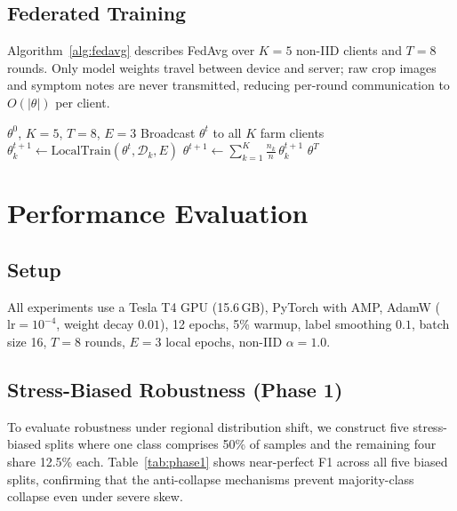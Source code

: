 \documentclass[conference]{IEEEtran}
\begin{document}
\subsection{Federated Training}

Algorithm~\ref{alg:fedavg} describes FedAvg over $K{=}5$ non-IID clients
and $T{=}8$ rounds. Only model weights travel between device and server;
raw crop images and symptom notes are never transmitted, reducing
per-round communication to $O(|\theta|)$ per client.

\begin{algorithm}[t]
\caption{FarmFederate FedAvg}
\label{alg:fedavg}
\begin{algorithmic}[1]
\REQUIRE $\theta^0$, $K{=}5$, $T{=}8$, $E{=}3$
  \STATE Broadcast $\theta^t$ to all $K$ farm clients
    \STATE $\theta_k^{t+1} \!\leftarrow\! \mathrm{LocalTrain}(\theta^t,\mathcal{D}_k,E)$
  \ENDFOR
  \STATE $\theta^{t+1} \leftarrow \sum_{k=1}^{K}\tfrac{n_k}{n}\,\theta_k^{t+1}$
\ENDFOR
\RETURN $\theta^T$
\end{algorithmic}
\end{algorithm}

\section{Performance Evaluation}

\subsection{Setup}

All experiments use a Tesla T4 GPU (15.6\,GB), PyTorch with AMP, AdamW
($\text{lr}{=}10^{-4}$, weight decay $0.01$), 12 epochs, 5\% warmup,
label smoothing $0.1$, batch size 16, $T{=}8$ rounds, $E{=}3$ local
epochs, non-IID $\alpha{=}1.0$.

\subsection{Stress-Biased Robustness (Phase 1)}

To evaluate robustness under regional distribution shift, we construct
five stress-biased splits where one class comprises 50\% of samples and
the remaining four share 12.5\% each. Table~\ref{tab:phase1} shows
near-perfect F1 across all five biased splits, confirming that the
anti-collapse mechanisms prevent majority-class collapse even under
severe skew.
\end{document}

